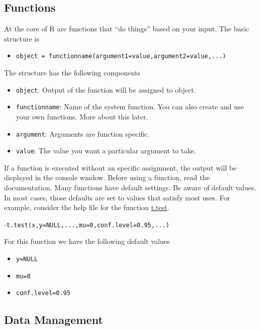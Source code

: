 \documentclass[
]{article}
\providecommand{\tightlist}{%
  \setlength{\itemsep}{0pt}\setlength{\parskip}{0pt}}
\begin{document}
\hypertarget{functions}{%
\subsection{Functions}\label{functions}}

At the core of R are functions that ``do things'' based on your input. The basic structure is

\begin{itemize}
\tightlist
\item
  \texttt{object\ =\ functionname(argument1=value,argument2=value,...)}
\end{itemize}

The structure has the following components

\begin{itemize}
\tightlist
\item
  \texttt{object}: Output of the function will be assigned to object.
\item
  \texttt{functionname}: Name of the system function. You can also create and use your own functions. More about this later.
\item
  \texttt{argument}: Arguments are function specific.
\item
  \texttt{value}: The value you want a particular argument to take.
\end{itemize}

If a function is executed without an specific assignment, the output will be displayed in the console window. Before using a function, read the documentation. Many functions have default settings. Be aware of default values. In most cases, those defaults are set to values that satisfy most uses. For example, consider the help file for the function \href{https://stat.ethz.ch/R-manual/R-devel/library/stats/html/t.test.html}{t.test}.

-\texttt{t.test(x,y=NULL,...,mu=0,conf.level=0.95,...)}

For this function we have the following default values

\begin{itemize}
\tightlist
\item
  \texttt{y=NULL}
\item
  \texttt{mu=0}
\item
  \texttt{conf.level=0.95}
\end{itemize}

\hypertarget{data-management}{%
\subsection{Data Management}\label{data-management}}
\end{document}
